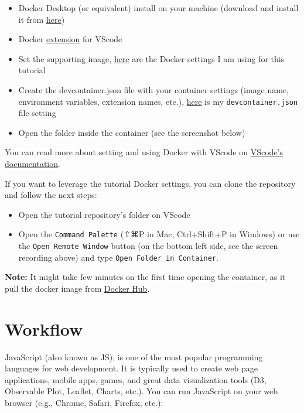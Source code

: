 \documentclass[
  letterpaper,
  DIV=11,
  numbers=noendperiod]{scrreprt}
\providecommand{\tightlist}{%
  \setlength{\itemsep}{0pt}\setlength{\parskip}{0pt}}\usepackage{longtable,booktabs,array}
\begin{document}
\begin{itemize}
\tightlist
\item
  Docker Desktop (or equivalent) install on your machine (download and
  install it from
  \href{https://www.docker.com/products/docker-desktop/}{here})
\item
  Docker
  \href{https://marketplace.visualstudio.com/items?itemName=ms-azuretools.vscode-docker}{extension}
  for VScode
\item
  Set the supporting image,
  \href{https://github.com/RamiKrispin/Tutorials/tree/main/docker}{here}
  are the Docker settings I am using for this tutorial
\item
  Create the devcontainer.json file with your container settings (image
  name, environment variables, extension names, etc.),
  \href{https://github.com/RamiKrispin/Tutorials/blob/main/.devcontainer/devcontainer.json}{here}
  is my \texttt{devcontainer.json} file setting
\item
  Open the folder inside the container (see the screenshot below)
\end{itemize}

You can read more about setting and using Docker with VScode on
\href{https://code.visualstudio.com/docs/containers/overview}{VScode's
documentation}.

If you want to leverage the tutorial Docker settings, you can clone the
repository and follow the next steps:

\begin{itemize}
\tightlist
\item
  Open the tutorial repository's folder on VScode
\item
  Open the \texttt{Command\ Palette} (⇧⌘P in Mac, Ctrl+Shift+P in
  Windows) or use the \texttt{Open\ Remote\ Window} button (on the
  bottom left side, see the screen recording above) and type
  \texttt{Open\ Folder\ in\ Container}.
\end{itemize}

\textbf{Note:} It might take few minutes on the first time opening the
container, as it pull the docker image from
\href{https://hub.docker.com/repository/docker/rkrispin/tutorial}{Docker
Hub}.

\hypertarget{workflow}{%
\section{Workflow}\label{workflow}}

JavaScript (also known as JS), is one of the most popular programming
languages for web development. It is typically used to create web page
applications, mobile apps, games, and great data visualization tools
(D3, Observable Plot, Leaflet, Charts, etc.). You can run JavaScript on
your web browser (e.g., Chrome, Safari, Firefox, etc.):
\end{document}
